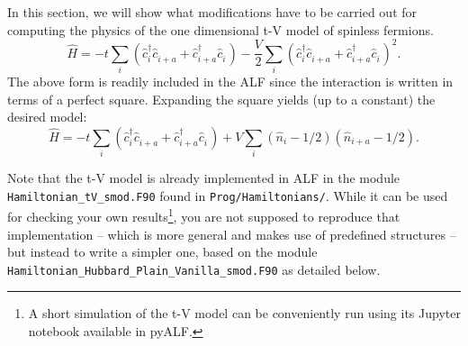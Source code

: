 \documentclass[10pt,modern]{scrartcl}
\numberwithin{exerciseitem}{exercise} %
\begin{document}
In this section, we will show what modifications have to be carried out for computing the physics of the  one dimensional t-V model of spinless fermions.  
\begin{equation}
\hat{H} =  -t \sum_{i} \left( \hat{c}^{\dagger}_{i}  \hat{c}^{\phantom\dagger}_{i+a}      + \hat{c}^{\dagger}_{i+a}  \hat{c}^{\phantom\dagger}_{i} \right) - \frac{V}{2} \sum_{i}  \left( \hat{c}^{\dagger}_{i}  \hat{c}^{\phantom\dagger}_{i+a}      + \hat{c}^{\dagger}_{i+a}  \hat{c}^{\phantom\dagger}_{i} \right)^2 .
\end{equation}
The above form is  readily included in the ALF since  the interaction is written in terms of a perfect square. Expanding the square  yields (up to a constant)  the desired model: 
\begin{equation}
\hat{H} =  -t \sum_{i} \left( \hat{c}^{\dagger}_{i}  \hat{c}^{\phantom\dagger}_{i+a}      + \hat{c}^{\dagger}_{i+a}  \hat{c}^{\phantom\dagger}_{i} \right)  + V  \sum_{i}  \left( \hat{n}_{i} - 1/2 \right)  \left( \hat{n}_{i+a} - 1/2 \right).
\end{equation}

Note that the t-V model is already implemented in ALF in the module \texttt{Hamiltonian\_tV\_smod.F90} found in  \texttt{Prog/Hamiltonians/}. While it can be used for checking your own results\footnote{A short simulation of the t-V model can be conveniently run using its Jupyter notebook available in pyALF.}, you are not supposed to reproduce that implementation -- which is more general and makes use of predefined structures -- but instead to write a simpler one, based on the module \texttt{Hamiltonian\_Hubbard\_Plain\_Vanilla\_smod.F90} as detailed below.


\end{document}
